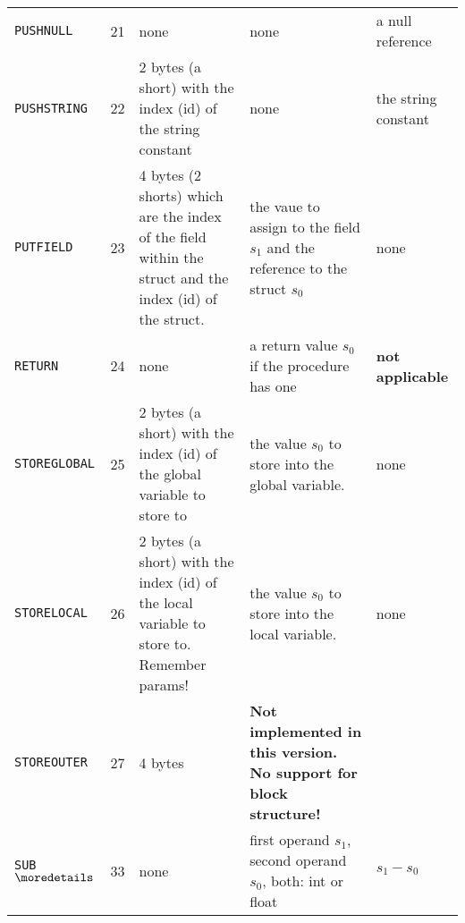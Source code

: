 \documentclass[11pt]{article}
\begin{document}
\begin{longtable}{|l|c|p{3.5cm}|p{3cm}|p{3cm}|}
\texttt{PUSHNULL} & 21 & none & none & a null reference\\
\texttt{PUSHSTRING} & 22 & 2 bytes (a short) with the index (id) of the string constant & none & the string constant\\
\texttt{PUTFIELD} & 23 & 4 bytes (2 shorts) which are the index of the field within the struct and the index (id) of the struct. & the vaue to assign to the field \(s_1\) and the reference to the struct \(s_0\) & none\\
\texttt{RETURN} & 24 & none & a return value \(s_0\) if the procedure has one & \textbf{not applicable}\\
\texttt{STOREGLOBAL} & 25 & 2 bytes (a short) with the index (id) of the global variable to store to & the value \(s_0\) to store into the global variable. & none\\
\texttt{STORELOCAL} & 26 & 2 bytes (a short) with the index (id) of the local variable to store to. Remember params! & the value \(s_0\) to store into the local variable. & none\\
\texttt{STOREOUTER} & 27 & 4 bytes & \textbf{Not implemented in this version. No support for block structure!} & \\
\texttt{SUB} \(\moredetails\) & 33 & none & first operand \(s_1\), second operand \(s_0\), both: int or float & \(s_1-s_0\)\\
\end{longtable}



\end{document}
